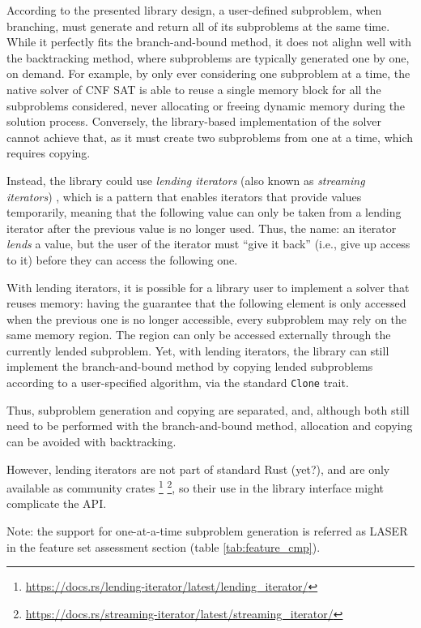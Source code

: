 According to the presented library design, a user-defined subproblem, when branching,
must generate and return all of its subproblems at the same time. While it perfectly fits
the branch-and-bound method, it does not alighn well with the backtracking method, where
subproblems are typically generated one by one, on demand. For example, by only ever
considering one subproblem at a time, the native solver of CNF SAT is able to reuse
a single memory block for all the subproblems considered, never allocating or freeing
dynamic memory during the solution process. Conversely, the library-based implementation
of the solver cannot achieve that, as it must create two subproblems from one
at a time, which requires copying.

Instead, the library could use \emph{lending iterators}
(also known as \emph{streaming iterators}) \cite{LendingIterator},
which is a pattern that enables iterators that provide values temporarily,
meaning that the following value can only be taken from a lending iterator after the previous
value is no longer used. Thus, the name: an iterator \emph{lends} a value,
but the user of the iterator must ``give it back'' (i.e., give up access to it)
before they can access the following one.

With lending iterators, it is possible for a library user to implement a solver that
reuses memory: having the guarantee that the following element is only accessed when
the previous one is no longer accessible, every subproblem may rely on the same memory
region. The region can only be accessed externally through the currently lended subproblem.
Yet, with lending iterators, the library can still implement the branch-and-bound method
by copying lended subproblems according to a user-specified algorithm, via the standard
\texttt{Clone} trait.

Thus, subproblem generation and copying are separated, and, although both still need to be
performed with the branch-and-bound method, allocation and copying can be avoided with
backtracking.

However, lending iterators are not part of standard Rust (yet?), and are only available as
community crates
\footnote{\url{https://docs.rs/lending-iterator/latest/lending_iterator/}}
\footnote{\url{https://docs.rs/streaming-iterator/latest/streaming_iterator/}},
so their use in the library interface might complicate the API.

Note: the support for one-at-a-time subproblem generation
is referred as LASER in the feature set assessment section (table \ref{tab:feature_cmp}).
